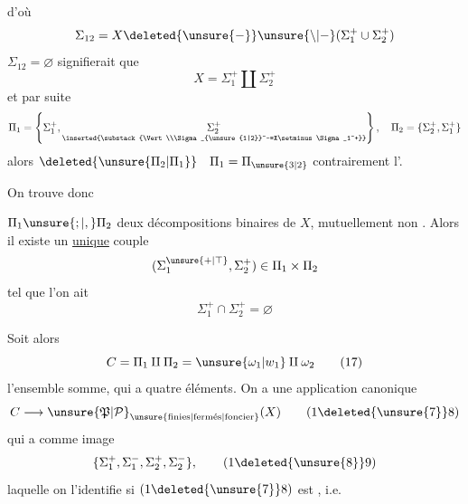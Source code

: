 d'où
\[
\Sigma_{12}=X\deleted{\unsure{-}}\unsure{\setminus|-}(\Sigma_1^+\cup\Sigma_2^+)
\]
 $\Sigma_{12}=\varnothing$ signifierait que
\[
X=\Sigma_1^+\amalg\Sigma_2^+
\]
et par suite
\[
\Pi_1=\left\{\Sigma_1^+,\underset{\inserted{\substack{\Vert\\\Sigma_{\unsure{1|2}}^-=X\setminus\Sigma_1^+}}}{\Sigma_2^+}\right\},
\quad \Pi_2=\{\Sigma_2^+,\Sigma_1^+\}
\]
alors $\deleted{\unsure{\Pi_2|\Pi_1}}\quad\Pi_1=\Pi_{\unsure{3|2}}$ contrairement  l'.

On trouve donc

\noindent\makebox[0pt][r]{\rule[-2.7ex]{.4pt}{3.8ex}\hspace{.45em}}   $\Pi_1\unsure{;|,}\Pi_2$ deux décompositions binaires de $X$, mutuellement non .
Alors il existe un \uline{unique} couple
\[
(\Sigma_1^{\unsure{+|\top}},\Sigma_2^+)\in\Pi_1\times\Pi_2
\]
\makebox[0pt][r]{\rule[-.35ex]{.4pt}{2ex}\hspace{.45em}}tel que l'on ait
\[
\Sigma_1^+\cap\Sigma_2^+=\varnothing
\]

\begingroup\makeatletter\tagsleft@true\makeatother
Soit alors
\[
C=\Pi_1\amalg\Pi_2=\unsure{\omega_1|w_1}\amalg\omega_2
\tag*{(17)}
\]
l'ensemble somme, qui a quatre éléments. On a une application canonique
\[
C\longrightarrow{\unsure{\mathfrak{P}|\mathcal{P}}}_{\unsure{\mathrm{finies}|\mathrm{ferm\acute{e}s}|\mathrm{foncier}}}(X)
\tag*{(1\deleted{\unsure{7}}8)}
\]
qui a comme image
\[
\{\Sigma_1^+,\Sigma_1^-,\Sigma_2^+,\Sigma_2^-\},
\tag*{(1\deleted{\unsure{8}}9)}
\]
 laquelle on l'identifie si $(1\deleted{\unsure{7}}8)$ est , i.e.

\endgroup
\clearpage
